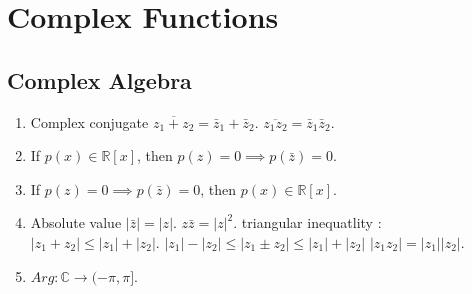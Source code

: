 \chapter{Complex Functions}
\section{Complex Algebra}
\begin{enumerate}
	\item Complex conjugate
		\subitem $\overline{z_1+z_2} = \bar{z}_1 + \bar{z}_2$.
		\subitem $\overline{z_1z_2} = \bar{z}_1 \bar{z}_2$.
	\item If $p(x) \in \mathbb{R}[x]$, then $p(z) = 0 \implies p(\bar{z}) = 0$.
	\item If $p(z) = 0 \implies p(\bar{z}) = 0$, then $p(x) \in \mathbb{R}[x]$.
	\item Absolute value
		\subitem $|\bar{z}| = |z|$.
		\subitem $z\bar{z} = |z|^2$.
		\subitem triangular inequatlity : $|z_1 + z_2 | \le |z_1| + |z_2|$.
		\subitem $|z_1| - |z_2| \le |z_1 \pm z_2| \le |z_1| + |z_2|$
		\subitem $|z_1z_2| = |z_1| |z_2|$.
	\item $Arg : \mathbb{C} \to (-\pi,\pi]$.
\end{enumerate}
